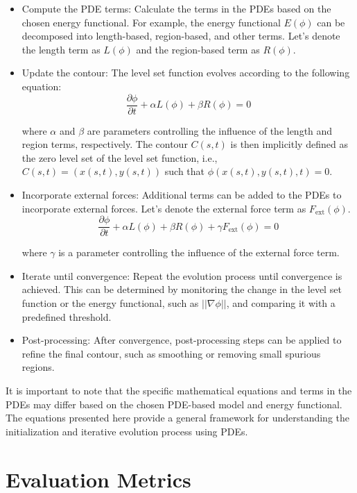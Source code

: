 \documentclass[]{report}
\begin{document}
\begin{itemize}
\item Compute the PDE terms: Calculate the terms in the PDEs based on the chosen energy functional. For example, the energy functional $E(\phi)$ can be decomposed into length-based, region-based, and other terms. Let's denote the length term as $L(\phi)$ and the region-based term as $R(\phi)$.

\item Update the contour: The level set function evolves according to the following equation:
\[\frac{\partial \phi}{\partial t} + \alpha L(\phi) + \beta R(\phi) = 0\]


where $\alpha$ and $\beta$ are parameters controlling the influence of the length and region terms, respectively. The contour $C(s, t)$ is then implicitly defined as the zero level set of the level set function, i.e., $C(s, t) = (x(s, t), y(s, t))$ such that $\phi(x(s, t), y(s, t), t) = 0$.

\item Incorporate external forces: Additional terms can be added to the PDEs to incorporate external forces. Let's denote the external force term as $F_{\text{ext}}(\phi)$.
\[\frac{\partial \phi}{\partial t} + \alpha L(\phi) + \beta R(\phi) + \gamma F_{\text{ext}}(\phi) = 0\]

where $\gamma$ is a parameter controlling the influence of the external force term.

\item Iterate until convergence: Repeat the evolution process until convergence is achieved. This can be determined by monitoring the change in the level set function or the energy functional, such as $||\nabla \phi||$, and comparing it with a predefined threshold.

\item Post-processing: After convergence, post-processing steps can be applied to refine the final contour, such as smoothing or removing small spurious regions.
\end{itemize}

It is important to note that the specific mathematical equations and terms in the PDEs may differ based on the chosen PDE-based model and energy functional. The equations presented here provide a general framework for understanding the initialization and iterative evolution process using PDEs.

\chapter*{Evaluation Metrics}
\end{document}
